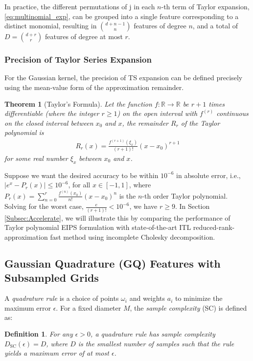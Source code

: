 \documentclass[8pt,twocolumn]{IEEEtran}
\newcommand{\R}{\mathbb{R}}
\newtheorem{thm}{Theorem}  \newtheorem{lem}[thm]{Lemma}        \newtheorem{cor}[thm]{Corollary}
\newtheorem{defn}{Definition}       \newtheorem{rem}{Remark}       \newtheorem{corollary}{Corollary}
\begin{document}
In practice, the different permutations of j in each $n$-th term of Taylor expansion, \eqref{eq:multinomial_exp}, can be grouped into a single feature corresponding to a distinct monomial, resulting in ${{d+n-1} \choose {n}}$ features of degree $n$, and a total of $D={{d+r} \choose {r}}$ features of degree at most $r$.
\subsubsection{Precision of Taylor Series Expansion}\label{Subsec:TSPrecision}
For the Gaussian kernel, the precision of TS expansion can be defined precisely using the mean-value form of the approximation remainder.
\begin{thm}[Taylor's Formula]
	Let the function $f:\R\rightarrow\R$ be $r+1$ times differentiable (where the integer $r\geq 1$) on the open interval with $f^{(r)}$ continuous on the closed interval between $x_0$ and $x$, the remainder $R_r$ of the Taylor polynomial is
	\begin{align}
	R_r(x)=\frac{f^{(r+1)}(\xi_x)}{(r+1)!}(x-x_0)^{r+1}\label{eq:TSremainder}
	\end{align}
	for some real number $\xi_x$ between $x_0$ and $x$.
\end{thm} 
Suppose we want the desired accuracy to be within $10^{-6}$ in absolute error, i.e., $|e^x-P_r(x)|\leq 10^{-6}$, for all $x\in[-1,1]$, where $P_r(x)=\sum_{n=0}^{r}\frac{f^{(n)}(x_0)}{n!}(x-x_0)^n$ is the $n$-th order Taylor polynomial. Solving for the worst case, $\frac{e}{(r+1)!}<10^{-6}$, we have $r\geq 9$. In Section \ref{Subsec:Accelerate}, we will illustrate this by comparing the performance of Taylor polynomial EIPS formulation with state-of-the-art ITL reduced-rank-approximation fast method using incomplete Cholesky decomposition. 

\subsection{Gaussian Quadrature (GQ) Features with Subsampled Grids}
A \emph{quadrature rule} is a choice of points $\omega_i$ and weights $a_i$ to minimize the maximum error $\epsilon$. For a fixed diameter $M$, the \emph{sample complexity} (SC) is defined as:
\begin{defn}
	\label{defnSampleComplexity}
	For any $\epsilon > 0$, a quadrature rule has sample complexity $D_{\mathrm{SC}}(\epsilon) = D$, where $D$ is the smallest number of samples such that the rule yields a maximum error of at most $\epsilon$.
\end{defn}
\end{document}
